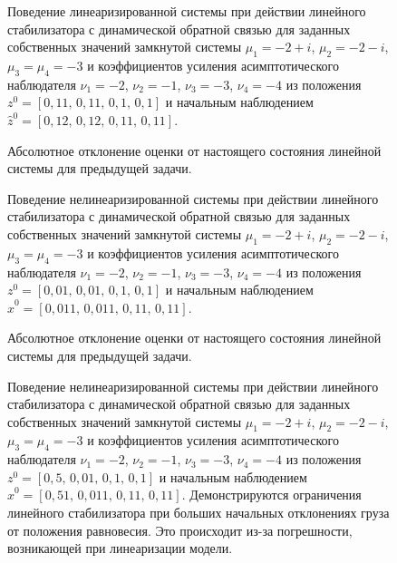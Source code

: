 \begin{figure}[t]
	\centering
	
	\caption{Поведение линеаризированной системы при действии линейного стабилизатора с динамической обратной связью для заданных собственных значений замкнутой системы $\mu_1 = -2 + i$, $\mu_2 = -2 - i$, $\mu_3 = \mu_4 = -3$ и коэффициентов усиления асимптотического наблюдателя $\nu_1 = -2$, $\nu_2 = -1$, $\nu_3=-3$, $\nu_4=-4$ из положения $z^0 = [0,\!11,\,0,\!11,\,0,\!1,\,0,\!1]$ и начальным наблюдением $\hat z^0 = [0,\!12,\,0,\!12,\,0,\!11,\,0,\!11]$.}
\end{figure}

\begin{figure}[t]
	\centering
	
	\caption{Абсолютное отклонение оценки от настоящего состояния линейной системы для предыдущей задачи.}
\end{figure}

\begin{figure}[t]
	\centering
	
	\caption{Поведение нелинеаризированной системы при действии линейного стабилизатора с динамической обратной связью для заданных собственных значений замкнутой системы $\mu_1 = -2 + i$, $\mu_2 = -2 - i$, $\mu_3 = \mu_4 = -3$ и коэффициентов усиления асимптотического наблюдателя $\nu_1 = -2$, $\nu_2 = -1$, $\nu_3=-3$, $\nu_4=-4$ из положения $z^0 = [0,\!01,\,0,\!01,\,0,\!1,\,0,\!1]$ и начальным наблюдением $\hat x^0 = [0,\!011,\,0,\!011,\,0,\!11,\,0,\!11]$.}
\end{figure}

\begin{figure}[t]
	\centering
	
	\caption{Абсолютное отклонение оценки от настоящего состояния линейной системы для предыдущей задачи.}
\end{figure}

\begin{figure}[t]
	\centering
	
	\caption{Поведение нелинеаризированной системы при действии линейного стабилизатора с динамической обратной связью для заданных собственных значений замкнутой системы $\mu_1 = -2 + i$, $\mu_2 = -2 - i$, $\mu_3 = \mu_4 = -3$ и коэффициентов усиления асимптотического наблюдателя $\nu_1 = -2$, $\nu_2 = -1$, $\nu_3=-3$, $\nu_4=-4$ из положения $z^0 = [0,\!5,\,0,\!01,\,0,\!1,\,0,\!1]$ и начальным наблюдением $\hat x^0 = [0,\!51,\,0,\!011,\,0,\!11,\,0,\!11]$. Демонстрируются ограничения линейного стабилизатора при больших начальных отклонениях груза от положения равновесия. Это происходит из-за погрешности, возникающей при линеаризации модели.}
\end{figure}

